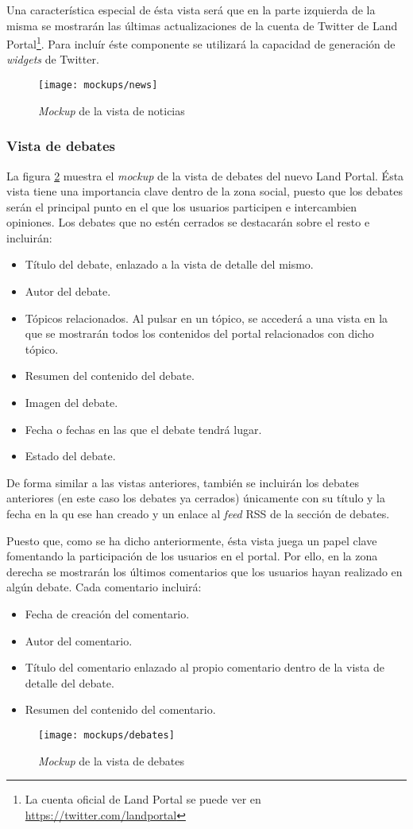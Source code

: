 Una característica especial de ésta vista será que en la parte izquierda de la misma se mostrarán las últimas actualizaciones de la cuenta de Twitter de Land Portal\footnote{La cuenta oficial de Land Portal se puede ver en \url{https://twitter.com/landportal}}.  Para incluír éste componente se utilizará la capacidad de generación de \textit{widgets} de Twitter.
\begin{figure}[h]
	\centering
	\texttt{[image: mockups/news]}
	\caption{\textit{Mockup} de la vista de noticias}
	\label{fig:mockup_noticias}
\end{figure}


\subsubsection{Vista de debates}
La figura \ref{fig:mockup_debates} muestra el \textit{mockup} de la vista de debates del nuevo Land Portal.  Ésta vista tiene una importancia clave dentro de la zona social, puesto que los debates serán el principal punto en el que los usuarios participen e intercambien opiniones.  Los debates que no estén cerrados se destacarán sobre el resto e incluirán:
\begin{itemize}
	\item Título del debate, enlazado a la vista de detalle del mismo.
	\item Autor del debate.
	\item Tópicos relacionados.  Al pulsar en un tópico, se accederá a una vista en la que se mostrarán todos los contenidos del portal relacionados con dicho tópico.
	\item Resumen del contenido del debate.
	\item Imagen del debate.
	\item Fecha o fechas en las que el debate tendrá lugar.
	\item Estado del debate.
\end{itemize}

De forma similar a las vistas anteriores, también se incluirán los debates anteriores (en este caso los debates ya cerrados) únicamente con su título y la fecha en la qu ese han creado y un enlace al \textit{feed} RSS de la sección de debates.

Puesto que, como se ha dicho anteriormente, ésta vista juega un papel clave fomentando la participación de los usuarios en el portal.  Por ello, en la zona derecha se mostrarán los últimos comentarios que los usuarios hayan realizado en algún debate.  Cada comentario incluirá:
\begin{itemize}
	\item Fecha de creación del comentario.
	\item Autor del comentario.
	\item Título del comentario enlazado al propio comentario dentro de la vista de detalle del debate.
	\item Resumen del contenido del comentario.
\end{itemize}
\begin{figure}[h]
	\centering
	\texttt{[image: mockups/debates]}
	\caption{\textit{Mockup} de la vista de debates}
	\label{fig:mockup_debates}
\end{figure}


